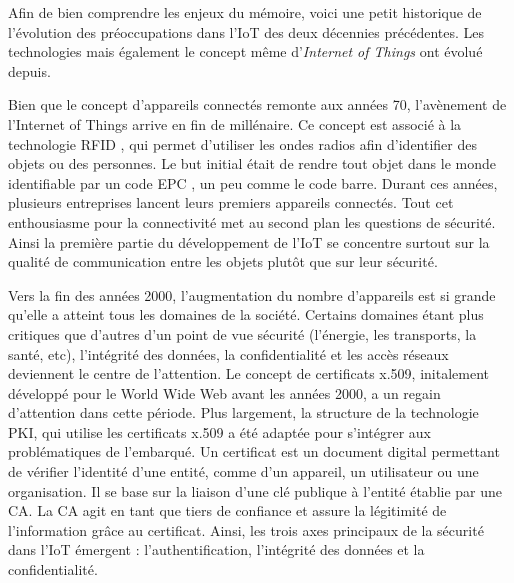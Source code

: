 \vspace{0.1cm}

Afin de bien comprendre les enjeux du mémoire, voici une petit historique de l'évolution des préoccupations dans l'\ac{IoT} des deux décennies précédentes. Les technologies mais également le concept même d'\textit{Internet of Things} ont évolué depuis.

\vspace{0.1cm}

Bien que le concept d'appareils connectés remonte aux années 70, l'avène\-ment de l'Internet of Things arrive en fin de millénaire. Ce concept est associé à la technologie \ac{RFID} \cite{RFID}, qui permet d'utiliser les ondes radios afin d'identifier des objets ou des personnes. Le but initial était de rendre tout objet dans le monde identifiable par un code \ac{EPC} \cite{EPC}, un peu comme le code barre. Durant ces années, plusieurs entreprises lancent leurs premiers appareils connectés. Tout cet enthousiasme pour la connectivité met au second plan les questions de sécurité. Ainsi la première partie du développement de l'\ac{IoT} se concentre surtout sur la qualité de communication entre les objets plutôt que sur leur sécurité.

\vspace{0.1cm}

Vers la fin des années 2000, l'augmentation du nombre d'appareils est si grande qu'elle a atteint tous les domaines de la société. Certains domaines étant plus critiques que d'autres d'un point de vue sécurité (l'énergie, les transports, la santé, etc), l'intégrité des données, la confidentialité et les accès réseaux deviennent le centre de l'attention. 
Le concept de certificats x.509, initalement dévelop\-pé pour le World Wide Web avant les années 2000, a un regain d'attention dans cette période. Plus largement, la structure de la technologie \ac{PKI}, qui utilise les certificats x.509 \cite{PKI} a été adaptée pour s'intégrer aux problématiques de l'embarqué. Un certificat est un document digital permettant de vérifier l'identité d'une entité, comme d'un appareil, un utilisateur ou une organisation. Il se base sur la liaison d'une clé publique à l'entité établie par une \ac{CA}. La CA agit en tant que tiers de confiance et assure la légitimité de l'information grâce au certificat. Ainsi, les trois axes principaux de la sécurité dans l'\ac{IoT} émergent : l'authentification, l'intégrité des données et la confidentialité.

\vspace{0.1cm}


